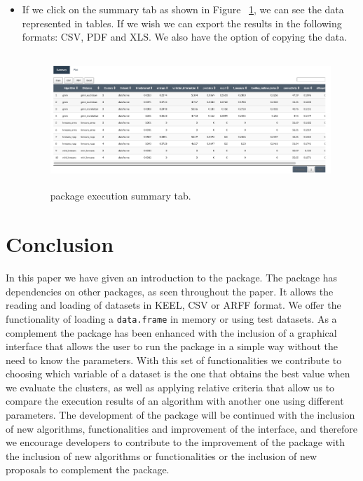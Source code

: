 \begin{enumerate}
\begin{itemize}
    \item If we click on the summary tab as shown in Figure ~\ref{fig:tab_summary}, we can see the data represented in tables. If we wish we can export the results in the following formats: CSV, PDF and XLS. We also have the option of copying the data.

  \begin{figure}[htbp]
    \centering
     \includegraphics[width=14cm, height=5cm]{img/tab_summary}
      \caption{ package execution summary tab.}
      \label{fig:tab_summary}
  \end{figure}

  \end{itemize}

\end{enumerate}
\newpage
\section{Conclusion}

In this paper we have given an introduction to the  package. The package has dependencies on other packages, as seen throughout the paper. It allows the reading and loading of datasets in KEEL, CSV or ARFF format. We offer the functionality of loading a \texttt{data.frame} in memory or using test datasets. As a complement the package has been enhanced with the inclusion of a graphical interface that allows the user to run the package in a simple way without the need to know the parameters. With this set of functionalities we contribute to choosing which variable of a dataset is the one that obtains the best value when we evaluate the clusters, as well as applying relative criteria that allow us to compare the execution results of an algorithm with another one using different parameters. The development of the package will be continued with the inclusion of new algorithms, functionalities and improvement of the interface, and therefore we encourage developers to contribute to the improvement of the package with the inclusion of new algorithms or functionalities or the inclusion of new proposals to complement the package.

